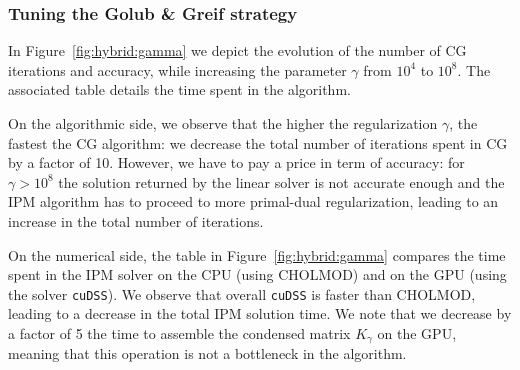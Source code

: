 \begin{table}[!ht]
  \centering
  \caption{Comparing the performance of cuDSS with CHOLMOD.
    The matrix $K_\gamma$ is symmetric positive definite, with
    a size $n = 85,568$. The matrix is super sparse: the number of nonzeroes is $1,057,200$ ($0.01$\%).
    \label{tab:linsol:time}
    (A30 GPU)
  }
\end{table}


\subsubsection{Tuning the Golub \& Greif strategy}
In Figure~\ref{fig:hybrid:gamma} we depict the evolution of the number
of CG iterations and accuracy, while increasing the parameter $\gamma$
from $10^4$ to $10^8$. The associated table details the time spent
in the algorithm.

On the algorithmic side, we observe that the higher the regularization $\gamma$,
the fastest the CG algorithm: we decrease the total number of iterations
spent in CG by a factor of 10. However, we have to pay a price in term
of accuracy: for $\gamma > 10^8$ the solution returned by the linear solver
is not accurate enough and the IPM algorithm has to proceed to more
primal-dual regularization, leading to an increase in the total number of iterations.

On the numerical side, the table in Figure~\ref{fig:hybrid:gamma} compares
the time spent in the IPM solver on the CPU (using CHOLMOD) and on the GPU
(using the solver {\tt cuDSS}). We observe that overall {\tt cuDSS} is
faster than CHOLMOD, leading to a decrease in the total IPM solution time.
We note that we decrease by a factor of 5 the time to assemble the condensed
matrix $K_\gamma$ on the GPU, meaning that this operation is not a bottleneck in
the algorithm.

